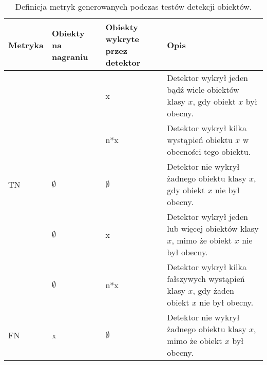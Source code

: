 \begin{table}[H]
\centering
\caption{Definicja metryk generowanych podczas testów detekcji obiektów.}
\begin{tabular}{|>{\centering\arraybackslash}m{2cm}|>{\centering\arraybackslash}m{2cm}|>{\centering\arraybackslash}m{2cm}|>{\centering\arraybackslash}m{7.5cm}|}
\hline
\textbf{Metryka} & \textbf{Obiekty na nagraniu} & \textbf{Obiekty wykryte przez detektor} & \textbf{Opis} \\ \hline
\multirow{2}{*}{TP} & \multirow{2}{*}{x} & x & Detektor wykrył jeden bądź wiele obiektów klasy $x$, gdy obiekt $x$ był obecny. \\ \cline{3-4}
 &  & n*x & Detektor wykrył kilka wystąpień obiektu $x$ w obecności tego obiektu. \\ \hline
TN & $\emptyset$ & $\emptyset$ & Detektor nie wykrył żadnego obiektu klasy $x$, gdy obiekt $x$ nie był obecny. \\ \hline
\multirow{2}{*}{FP} & $\emptyset$ & x & Detektor wykrył jeden lub więcej obiektów klasy $x$, mimo że obiekt $x$ nie był obecny. \\ \cline{2-4}
 & $\emptyset$ & n*x & Detektor wykrył kilka fałszywych wystąpień klasy $x$, gdy żaden obiekt $x$ nie był obecny. \\ \hline
FN & x & $\emptyset$ & Detektor nie wykrył żadnego obiektu klasy $x$, mimo że obiekt $x$ był obecny. \\ \hline
\end{tabular}
\end{table}